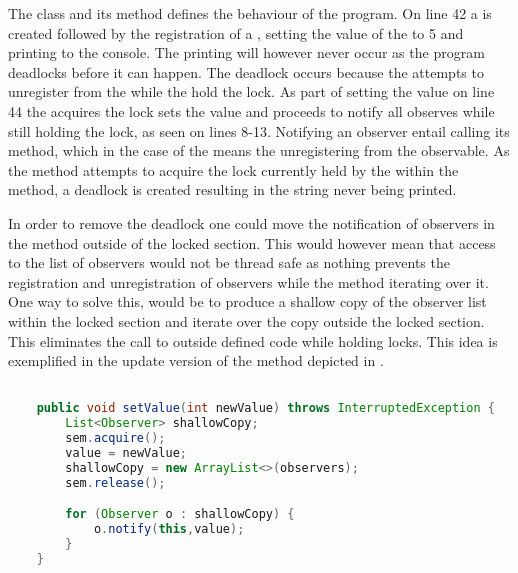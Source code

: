 The  class and its  method defines the behaviour of the program. On line 42 a  is created followed by the registration of a , setting the value of the  to 5 and printing  to the console. The printing will however never occur as the program deadlocks before it can happen. The deadlock occurs because the  attempts to unregister from the  while the  hold the lock. As part of setting the value on line 44 the  acquires the lock sets the value and proceeds to notify all observes while still holding the lock, as seen on lines 8-13. Notifying an observer entail calling its  method, which in the case of the  means the  unregistering from the observable. As the  method attempts to acquire the lock currently held by the  within the  method, a deadlock is created resulting in the  string never being printed.

In order to remove the deadlock one could move the notification of observers in the  method outside of the locked section. This would however mean that access to the list of observers would not be thread safe as nothing prevents the registration and unregistration of observers while the  method iterating over it. One way to solve this, would be to produce a shallow copy of the observer list within the locked section and iterate over the copy outside the locked section. This eliminates the call to outside defined code while holding locks. This idea is exemplified in the update version of the  method depicted in .

\begin{lstlisting}[float,label=lst:observer_updated,
  caption={Observer pattern with locks},
  language=Java,  
  showspaces=false,
  showtabs=false,
  breaklines=true,
  showstringspaces=false,
  breakatwhitespace=true,
  commentstyle=\color{greencomments},
  keywordstyle=\color{bluekeywords},
  stringstyle=\color{redstrings}]  % Start your code-block

    public void setValue(int newValue) throws InterruptedException {
        List<Observer> shallowCopy;
        sem.acquire();
        value = newValue;
        shallowCopy = new ArrayList<>(observers);
        sem.release();

        for (Observer o : shallowCopy) {
            o.notify(this,value);
        }
    }
\end{lstlisting}

